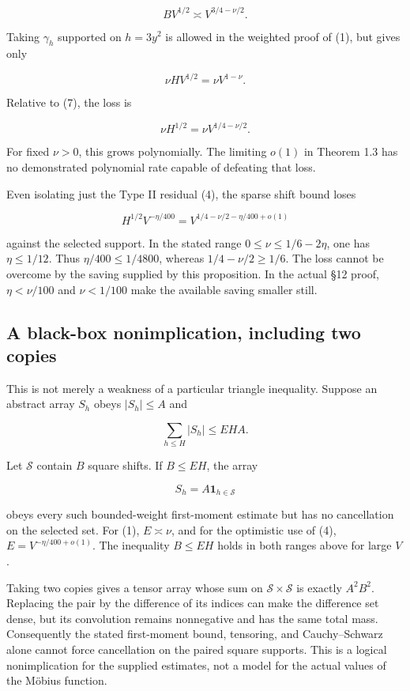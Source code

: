 \[
B V^{1/2}\asymp V^{3/4-\nu/2}.
\tag{7}
\]

Taking \(\gamma_h\) supported on \(h=3y^2\) is allowed in the weighted
proof of (1), but gives only

\[
\nu HV^{1/2}=\nu V^{1-\nu}.
\tag{8}
\]

Relative to (7), the loss is

\[
\nu H^{1/2}=\nu V^{1/4-\nu/2}.
\tag{9}
\]

For fixed \(\nu>0\), this grows polynomially. The limiting \(o(1)\) in
Theorem 1.3 has no demonstrated polynomial rate capable of defeating
that loss.

Even isolating just the Type II residual (4), the sparse shift bound
loses

\[
H^{1/2}V^{-\eta/400}
=V^{1/4-\nu/2-\eta/400+o(1)}
\tag{10}
\]

against the selected support. In the stated range
\(0\le\nu\le1/6-2\eta\), one has \(\eta\le1/12\). Thus
\(\eta/400\le1/4800\), whereas \(1/4-\nu/2\ge1/6\). The loss cannot be
overcome by the saving supplied by this proposition. In the actual §12
proof, \(\eta<\nu/100\) and \(\nu<1/100\) make the available saving
smaller still.

\subsection{A black-box nonimplication, including two
copies}\label{a-black-box-nonimplication-including-two-copies}

This is not merely a weakness of a particular triangle inequality.
Suppose an abstract array \(S_h\) obeys \(|S_h|\le A\) and

\[
\sum_{h\le H}|S_h|\le EHA.
\]

Let \(\mathcal S\) contain \(B\) square shifts. If \(B\le EH\), the
array

\[
S_h=A\mathbf1_{h\in\mathcal S}
\]

obeys every such bounded-weight first-moment estimate but has no
cancellation on the selected set. For (1), \(E\asymp\nu\), and for the
optimistic use of (4), \(E=V^{-\eta/400+o(1)}\). The inequality
\(B\le EH\) holds in both ranges above for large \(V\).

Taking two copies gives a tensor array whose sum on
\(\mathcal S\times\mathcal S\) is exactly \(A^2B^2\). Replacing the pair
by the difference of its indices can make the difference set dense, but
its convolution remains nonnegative and has the same total mass.
Consequently the stated first-moment bound, tensoring, and
Cauchy--Schwarz alone cannot force cancellation on the paired square
supports. This is a logical nonimplication for the supplied estimates,
not a model for the actual values of the Möbius function.

